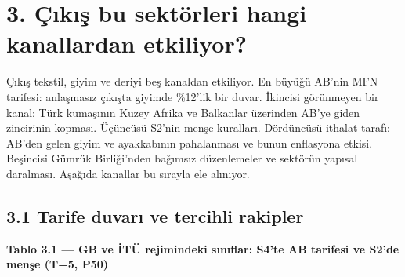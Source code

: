 \hypertarget{nace_kartlar_13-15-3-uxe7ux131kux131ux15f-bu-sektuxf6rleri-hangi-kanallardan-etkiliyor}{%
\section{3. Çıkış bu sektörleri hangi kanallardan etkiliyor?}\label{nace_kartlar_13-15-3-uxe7ux131kux131ux15f-bu-sektuxf6rleri-hangi-kanallardan-etkiliyor}}

Çıkış tekstil, giyim ve deriyi beş kanaldan etkiliyor. En büyüğü AB'nin MFN tarifesi: anlaşmasız çıkışta giyimde \%12'lik bir duvar. İkincisi görünmeyen bir kanal: Türk kumaşının Kuzey Afrika ve Balkanlar üzerinden AB'ye giden zincirinin kopması. Üçüncüsü S2'nin menşe kuralları. Dördüncüsü ithalat tarafı: AB'den gelen giyim ve ayakkabının pahalanması ve bunun enflasyona etkisi. Beşincisi Gümrük Birliği'nden bağımsız düzenlemeler ve sektörün yapısal daralması. Aşağıda kanallar bu sırayla ele alınıyor.

\hypertarget{nace_kartlar_13-15-31-tarife-duvarux131-ve-tercihli-rakipler}{%
\subsection{3.1 Tarife duvarı ve tercihli rakipler}\label{nace_kartlar_13-15-31-tarife-duvarux131-ve-tercihli-rakipler}}


\textbf{Tablo 3.1 --- GB ve İTÜ rejimindeki sınıflar: S4'te AB tarifesi ve S2'de menşe (T+5, P50)}

\nopagebreak[4]

\begingroup\gbtablo\footnotesize

